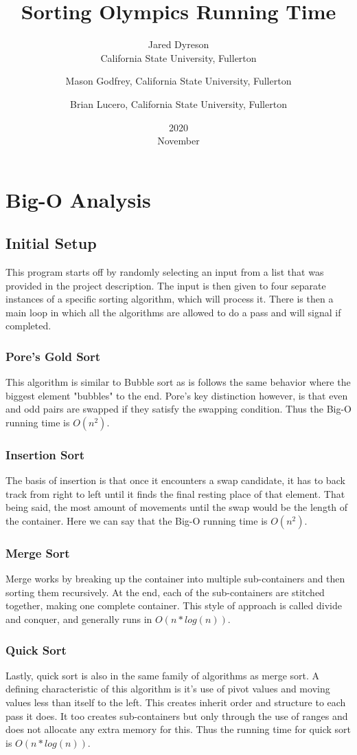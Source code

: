 \documentclass{article}
\title{Sorting Olympics Running Time}
\date{2020\\ November}
\author{Jared Dyreson\\ California State University, Fullerton 
\and Mason Godfrey, California State University, Fullerton
\and Brian Lucero, California State University, Fullerton}
\begin{document}
\maketitle
\tableofcontents
\newpage

\section{Big-O Analysis}

\subsection{Initial Setup}
This program starts off by randomly selecting an input from a list that was provided in the project description.
The input is then given to four separate instances of a specific sorting algorithm, which will process it.
There is then a main loop in which all the algorithms are allowed to do a pass and will signal if completed.

\subsubsection{Pore's Gold Sort}

This algorithm is similar to Bubble sort as is follows the same behavior where the biggest element "bubbles" to the end.
Pore's key distinction however, is that even and odd pairs are swapped if they satisfy the swapping condition.
Thus the Big-O running time is $O(n^2)$.

\subsubsection{Insertion Sort}

The basis of insertion is that once it encounters a swap candidate, it has to back track from right to left until it finds the final resting place of that element.
That being said, the most amount of movements until the swap would be the length of the container.
Here we can say that the Big-O running time is $O(n^2)$.

\subsubsection{Merge Sort}

Merge works by breaking up the container into multiple sub-containers and then sorting them recursively.
At the end, each of the sub-containers are stitched together, making one complete container.
This style of approach is called divide and conquer, and generally runs in $O(n * log(n))$.

\subsubsection{Quick Sort}

Lastly, quick sort is also in the same family of algorithms as merge sort.
A defining characteristic of this algorithm is it's use of pivot values and moving values less than itself to the left.
This creates inherit order and structure to each pass it does.
It too creates sub-containers but only through the use of ranges and does not allocate any extra memory for this.
Thus the running time for quick sort is $O(n * log(n))$.
\end{document}
